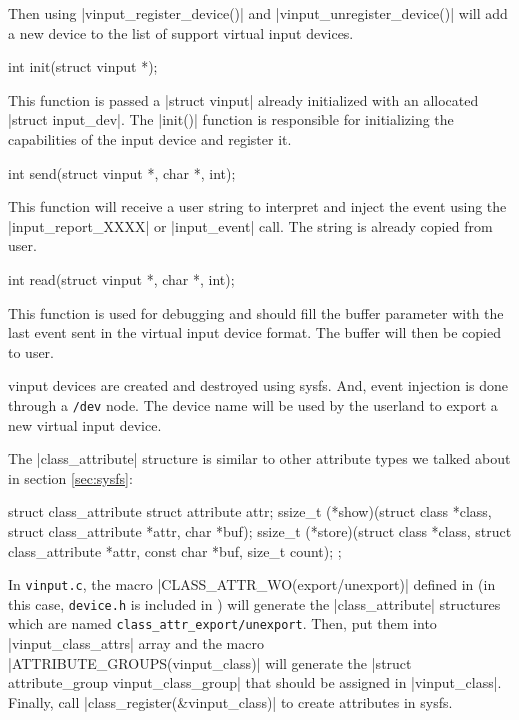 \documentclass[10pt, oneside]{book}
\begin{document}
Then using \cpp|vinput_register_device()| and \cpp|vinput_unregister_device()| will add a new device to the list of support virtual input devices.

\begin{code}
int init(struct vinput *);
\end{code}

This function is passed a \cpp|struct vinput| already initialized with an allocated \cpp|struct input_dev|.
The \cpp|init()| function is responsible for initializing the capabilities of the input device and register it.

\begin{code}
int send(struct vinput *, char *, int);
\end{code}

This function will receive a user string to interpret and inject the event using the \cpp|input_report_XXXX| or \cpp|input_event| call.
The string is already copied from user.

\begin{code}
int read(struct vinput *, char *, int);
\end{code}

This function is used for debugging and should fill the buffer parameter with the last event sent in the virtual input device format.
The buffer will then be copied to user.

vinput devices are created and destroyed using sysfs.
And, event injection is done through a \verb|/dev| node.
The device name will be used by the userland to export a new virtual input device.

The \cpp|class_attribute| structure is similar to other attribute types we talked about in section \ref{sec:sysfs}:

\begin{code}
struct class_attribute {
    struct attribute attr;
    ssize_t (*show)(struct class *class, struct class_attribute *attr,
                    char *buf);
    ssize_t (*store)(struct class *class, struct class_attribute *attr,
                    const char *buf, size_t count);
};
\end{code}

In \verb|vinput.c|, the macro \cpp|CLASS_ATTR_WO(export/unexport)| defined in  (in this case, \verb|device.h| is included in ) will generate the \cpp|class_attribute| structures which are named \verb|class_attr_export/unexport|.
Then, put them into \cpp|vinput_class_attrs| array and the macro \cpp|ATTRIBUTE_GROUPS(vinput_class)| will generate the \cpp|struct attribute_group vinput_class_group| that should be assigned in \cpp|vinput_class|.
Finally, call \cpp|class_register(&vinput_class)| to create attributes in sysfs.
\end{document}
